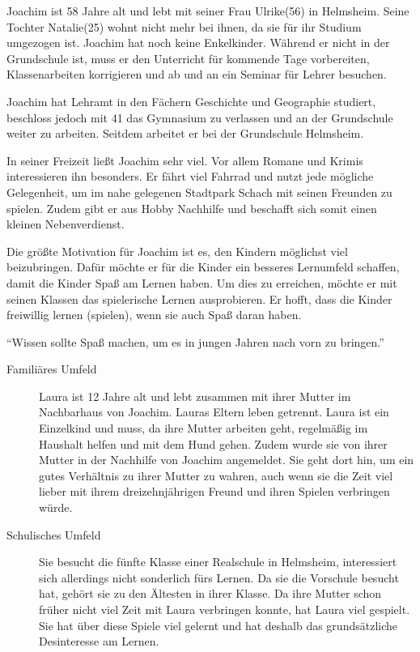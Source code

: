 \begin{description}
\begin{description}
			\item[Familiäres Umfeld]{Joachim ist 58 Jahre alt und lebt mit seiner Frau Ulrike(56) in Helmsheim. Seine Tochter Natalie(25) wohnt nicht mehr bei ihnen, da sie für ihr Studium umgezogen ist. Joachim hat noch keine Enkelkinder. Während er nicht in der Grundschule ist, muss er den Unterricht für kommende Tage vorbereiten, Klassenarbeiten korrigieren und ab und an ein Seminar für Lehrer besuchen.}
			\item[Schulisches Umfeld]{Joachim hat Lehramt in den Fächern Geschichte und Geographie studiert, beschloss jedoch mit 41 das Gymnasium zu verlassen und an der Grundschule weiter zu arbeiten. Seitdem arbeitet er bei der Grundschule Helmsheim.}
			\item[Interessen und Hobbys]{In seiner Freizeit ließt Joachim sehr viel. Vor allem Romane und Krimis interessieren ihn besonders. Er fährt viel Fahrrad und nutzt jede mögliche Gelegenheit, um im nahe gelegenen Stadtpark Schach mit seinen Freunden zu spielen. Zudem gibt er aus Hobby Nachhilfe und beschafft sich somit einen kleinen Nebenverdienst.}
			\item[Motivation]{Die größte Motivation für Joachim ist es, den Kindern möglichst viel beizubringen. Dafür möchte er für die Kinder ein besseres Lernumfeld schaffen, damit die Kinder Spaß am Lernen haben. Um dies zu erreichen, möchte er mit seinen Klassen das spielerische Lernen ausprobieren. Er hofft, dass die Kinder freiwillig lernen (spielen), wenn sie auch Spaß daran haben.}
			\item{\enquote{Wissen sollte Spaß machen, um es in jungen Jahren nach vorn zu bringen.}}
		\end{description}
		\item[Laura Dietz: Die Rennfahrerin]<TODO: Bild>\hfill
		\begin{description}
			\item[Familiäres Umfeld]{Laura ist 12 Jahre alt und lebt zusammen mit ihrer Mutter im Nachbarhaus von Joachim. Lauras Eltern leben getrennt. Laura ist ein Einzelkind und muss, da ihre Mutter arbeiten geht, regelmäßig im Haushalt helfen und mit dem Hund gehen. Zudem wurde sie von ihrer Mutter in der Nachhilfe von Joachim angemeldet. Sie geht dort hin, um ein gutes Verhältnis zu ihrer Mutter zu wahren, auch wenn sie die Zeit viel lieber mit ihrem dreizehnjährigen Freund und ihren Spielen verbringen würde.}
			\item[Schulisches Umfeld]{Sie besucht die fünfte Klasse einer Realschule in Helmsheim, interessiert sich allerdings nicht sonderlich fürs Lernen. Da sie die Vorschule besucht hat, gehört sie zu den Ältesten in ihrer Klasse. Da ihre Mutter schon früher nicht viel Zeit mit Laura verbringen konnte, hat Laura viel gespielt. Sie hat über diese Spiele viel gelernt und hat deshalb das grundsätzliche Desinteresse am Lernen.}

\end{description}
\end{description}
